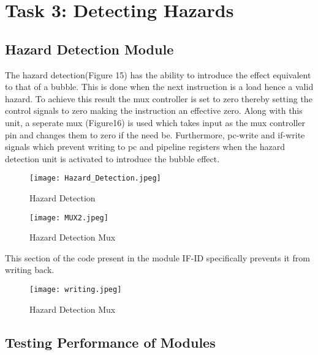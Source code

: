 \documentclass{article}
\begin{document}
\newpage
\section{Task 3: Detecting Hazards}
\subsection{{Hazard Detection Module}}

The hazard detection(Figure 15) has the ability to introduce the effect equivalent to that of a bubble. This is done when the next instruction is a load hence a valid hazard. To achieve this result the mux controller is set to zero thereby setting the control signals to zero making the instruction an effective zero. Along with this unit, a seperate mux (Figure16) is used which takes input as the mux controller pin and changes them to zero if the need be. Furthermore, pc-write and if-write signals which prevent writing to pc and pipeline registers when the hazard detection unit is activated to introduce the bubble effect. 

\begin{center}
    \begin{figure}[!htb]
        \centering
        \texttt{[image: Hazard\_Detection.jpeg]}
        \caption{Hazard Detection}
        \label{Snapshot of Memory}
    \end{figure}
\end{center}

\begin{center}
    \begin{figure}[!htb]
        \centering
        \texttt{[image: MUX2.jpeg]}
        \caption{Hazard Detection Mux}
        \label{Snapshot of Memory}
    \end{figure}
\end{center}

This section of the code present in the module IF-ID specifically prevents it from writing back.


\begin{center}
    \begin{figure}[!htb]
        \centering
        \texttt{[image: writing.jpeg]}
        \caption{Hazard Detection Mux}
        \label{Snapshot of Memory}
    \end{figure}
\end{center}


\subsection{{Testing Performance of Modules}}
\end{document}

